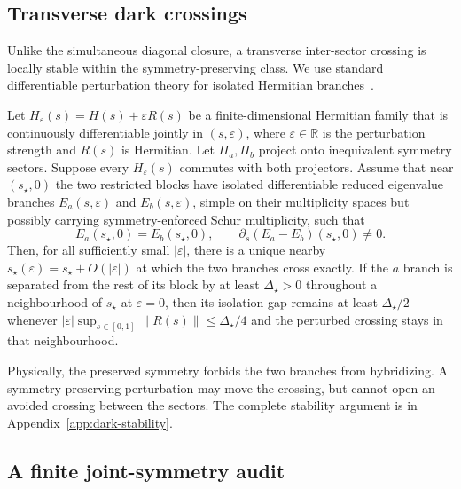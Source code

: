 \subsection{Transverse dark crossings}

Unlike the simultaneous diagonal closure, a transverse inter-sector
crossing is locally stable within the symmetry-preserving class.  We use
standard differentiable perturbation theory for isolated Hermitian
branches~\cite{Kato1995}.

\begin{theorem}
\label{thm:dark-crossing-stability}
Let $H_\varepsilon(s)=H(s)+\varepsilon R(s)$ be a finite-dimensional
Hermitian family that is continuously differentiable jointly in
$(s,\varepsilon)$, where $\varepsilon\in\mathbb R$ is
the perturbation strength and $R(s)$ is Hermitian.  Let $\Pi_a,\Pi_b$
project onto
inequivalent symmetry sectors.  Suppose every $H_\varepsilon(s)$ commutes
with both projectors.  Assume that near $(s_\star,0)$ the two restricted
blocks have isolated differentiable reduced eigenvalue branches
$E_a(s,\varepsilon)$ and $E_b(s,\varepsilon)$, simple on their multiplicity
spaces but possibly carrying symmetry-enforced Schur multiplicity, such that
\begin{equation}
 E_a(s_\star,0)=E_b(s_\star,0),
 \qquad
 \partial_s(E_a-E_b)(s_\star,0)\ne0.
 \label{eq:transverse-dark-hypothesis}
\end{equation}
Then, for all sufficiently small $|\varepsilon|$, there is a unique nearby
$s_\star(\varepsilon)=s_\star+O(|\varepsilon|)$ at which the two branches
cross exactly.
If the $a$ branch is separated from the rest of its block by at least
$\Delta_\star>0$ throughout a neighbourhood of $s_\star$ at
$\varepsilon=0$, then its isolation gap remains at least
$\Delta_\star/2$ whenever
$|\varepsilon|\sup_{s\in[0,1]}\|R(s)\|\leq\Delta_\star/4$ and the perturbed crossing
stays in that neighbourhood.
\end{theorem}

Physically, the preserved symmetry forbids the two branches from
hybridizing.  A symmetry-preserving perturbation may move the crossing, but
cannot open an avoided crossing between the sectors.  The complete
stability argument is in Appendix~\ref{app:dark-stability}.

\subsection{A finite joint-symmetry audit}

